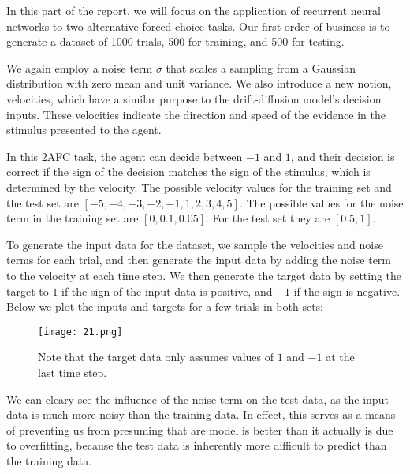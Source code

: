 \documentclass{article}
\begin{document}
In this part of the report, we will focus on the application of recurrent neural networks to two-alternative forced-choice tasks. Our first order of business is to generate a dataset of 1000 trials, 500 for training, and 500 for testing. 
\vspace{1em}

We again employ a noise term $\sigma$ that scales a sampling from a Gaussian distribution with zero mean and unit variance. We also introduce a new notion, velocities, which have a similar purpose to the drift-diffusion model's decision inputs. These velocities indicate the direction and speed of the evidence in the stimulus presented to the agent.
\vspace{1em}

In this 2AFC task, the agent can decide between $-1$ and $1$, and their decision is correct if the sign of the decision matches the sign of the stimulus, which is determined by the velocity. The possible velocity values for the training set and the test set are $[-5, -4, -3, -2, -1, 1, 2, 3, 4, 5]$. The possible values for the noise term in the training set are $[0, 0.1, 0.05]$. For the test set they are $[0.5, 1]$.
\vspace{1em}

To generate the input data for the dataset, we sample the velocities and noise terms for each trial, and then generate the input data by adding the noise term to the velocity at each time step. We then generate the target data by setting the target to $1$ if the sign of the input data is positive, and $-1$ if the sign is negative. Below we plot the inputs and targets for a few trials in both sets:

\begin{figure}[ht]
    \centering
    \texttt{[image: 21.png]}
    \caption{Note that the target data only assumes values of $1$ and $-1$ at the last time step.}
\end{figure}

We can cleary see the influence of the noise term on the test data, as the input data is much more noisy than the training data. In effect, this serves as a means of preventing us from presuming that are model is better than it actually is due to overfitting, because the test data is inherently more difficult to predict than the training data.
\vspace{1em}


\section{}
\end{document}
